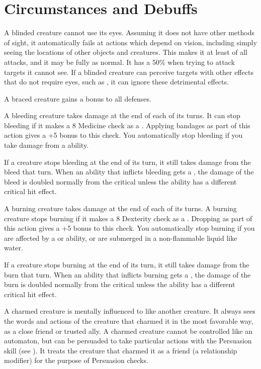   \newpage
\section{Circumstances and Debuffs}\label{Circumstances and Debuffs}

   A blinded creature cannot use its eyes.
  Assuming it does not have other methods of sight, it automatically fails at actions which depend on vision, including simply seeing the locations of other objects and creatures.
  This makes it at least \partiallyunaware of all attacks, and it may be fully \unaware as normal.
  It has a 50\%  when trying to attack targets it cannot see.
  If a blinded creature can perceive targets with other effects that do not require eyes, such as , it can ignore these detrimental effects.

   A braced creature gains a  bonus to all defenses.

   A bleeding creature takes damage at the end of each of its turns.
  It can stop bleeding if it makes a  8 Medicine check as a .
  Applying bandages as part of this action gives a +5 bonus to this check.
  You automatically stop bleeding if you take damage from a \atFire ability.

  If a creature stops bleeding at the end of its turn, it still takes damage from the bleed that turn.
  When an ability that inflicts bleeding gets a , the damage of the bleed is doubled normally from the critical unless the ability has a different critical hit effect.

   A burning creature takes damage at the end of each of its turns.
  A burning creature stops burning if it makes a  8 Dexterity check as a .
  Dropping \prone as part of this action gives a +5 bonus to this check.
  You automatically stop burning if you are affected by a \atCold or \atWater ability, or are submerged in a non-flammable liquid like water.

  If a creature stops burning at the end of its turn, it still takes damage from the burn that turn.
  When an ability that inflicts burning gets a , the damage of the burn is doubled normally from the critical unless the ability has a different critical hit effect.

   A charmed creature is mentally influenced to like another creature.
  It always sees the words and actions of the creature that charmed it in the most favorable way, as a close friend or trusted ally.
  A charmed creature cannot be controlled like an automaton, but can be persuaded to take particular actions with the Persuasion skill (see ).
  It treats the creature that charmed it as a friend (a  relationship modifier) for the purpose of Persuasion checks.


